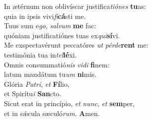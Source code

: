 \oddverse In ætérnum non oblivíscar justifica\textit{ti}\textit{ó}\textit{nes} \textbf{tu}as:~\*\\
\oddverse quia in ipsis vivi\textit{fi}\textbf{cá}sti me.\\
\evenverse Tuus sum e\textit{go}, \textit{sal}\textit{vum} \textbf{me} fac:~\*\\
\evenverse quóniam justificatiónes tuas ex\textit{qui}\textbf{sí}vi.\\
\oddverse Me exspectavérunt peccatóres \textit{ut} \textit{pér}\textit{de}\textbf{rent} me:~\*\\
\oddverse testimónia tua in\textit{tel}\textbf{lé}xi.\\
\evenverse Omnis consummatió\textit{nis} \textit{vi}\textit{di} \textbf{fi}nem:~\*\\
\evenverse latum mandátum tu\textit{um} \textbf{ni}mis.\\
\oddverse Glória \textit{Pa}\textit{tri}, \textit{et} \textbf{Fí}lio,~\*\\
\oddverse et Spirítu\textit{i} \textbf{San}cto.\\
\evenverse Sicut erat in princípio, \textit{et} \textit{nunc}, \textit{et} \textbf{sem}per,~\*\\
\evenverse et in sǽcula sæculó\textit{rum}. \textbf{A}men.\\
